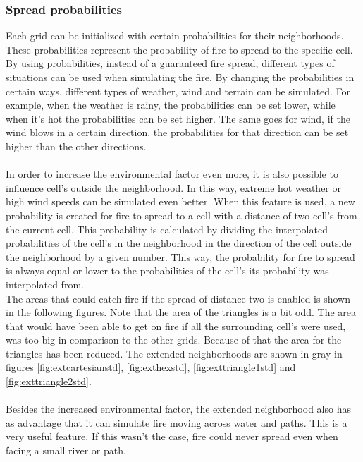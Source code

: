 \documentclass{article}
\begin{document}
\begin{multicols}{2}
\subsubsection*{Spread probabilities}
Each grid can be initialized with certain probabilities for their neighborhoods. These probabilities represent the probability of fire to spread to the specific cell. By using probabilities, instead of a guaranteed fire spread, different types of situations can be used when simulating the fire. By changing the probabilities in certain ways, different types of weather, wind and terrain can be simulated. For example, when the weather is rainy, the probabilities can be set lower, while when it’s hot the probabilities can be set higher. The same goes for wind, if the wind blows in a certain direction, the probabilities for that direction can be set higher than the other directions.\\\\
In order to increase the environmental factor even more, it is also possible to influence cell's outside the neighborhood. In this way, extreme hot weather or high wind speeds can be simulated even better. When this feature is used, a new probability is created for fire to spread to a cell with a distance of two cell's from the current cell. This probability is calculated by dividing the interpolated probabilities of the cell's in the neighborhood in the direction of the cell outside the neighborhood by a given number. This way, the probability for fire to spread is always equal or lower to the probabilities of the cell's its probability was interpolated from.\\
The areas that could catch fire if the spread of distance two is enabled is shown in the following figures. Note that the area of the triangles is a bit odd. The area that would have been able to get on fire if all the surrounding cell's were used, was too big in comparison to the other grids. Because of that the area for the triangles has been reduced. The extended neighborhoods are shown in gray in figures \ref{fig:extcartesianstd},  \ref{fig:exthexstd},  \ref{fig:exttriangle1std} and  \ref{fig:exttriangle2std}.\\\\
Besides the increased environmental factor, the extended neighborhood also has as advantage that it can simulate fire moving across water and paths. This is a very useful feature. If this wasn't the case, fire could never spread even when facing a small river or path.\\\\

\end{multicols}
\end{document}
